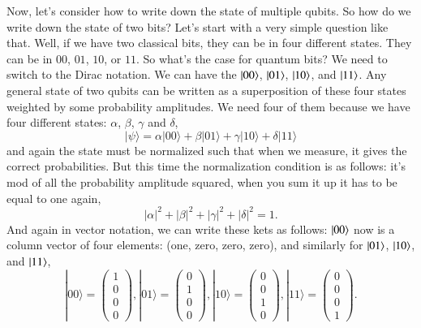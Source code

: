 Now, let's consider how to write down the state of multiple qubits. So how do we write down the state of two bits? Let's start with a very simple question like that. Well, if we have two classical bits, they can be in four different states. They can be in $00$, $01$, $10$, or $11$. So what's the case for quantum bits? We need to switch to the Dirac notation. We can have the $\left| 00 \right\rangle$, $\left| 01 \right\rangle$, $\left| 10 \right\rangle$, and $\left| 11 \right\rangle$. Any general state of two qubits can be written as a superposition of these four states weighted by some probability amplitudes. We need four of them because we have four different states: $\alpha$, $\beta$, $\gamma$ and $\delta$, 
\begin{equation}
|\psi\rangle=\alpha|00\rangle+\beta|01\rangle+\gamma|10\rangle+\delta|11\rangle
\end{equation}
and again the state must be normalized such that when we measure, it gives the correct probabilities. But this time the normalization condition is as follows: it's mod of all the probability amplitude squared, when you sum it up it has to be equal to one again,
\begin{equation}
|\alpha|^2+|\beta|^2+|\gamma|^2+|\delta|^2 = 1.
\end{equation}
And again in vector notation, we can write these kets as follows: $\left| 00 \right\rangle$ now is a column vector of four elements: (one, zero, zero, zero), and similarly for $\left| 01 \right\rangle$, $\left| 10 \right\rangle$, and $\left| 11 \right\rangle$,
\begin{equation}
|00\rangle=\left(\begin{array}{l}
1 \\
0 \\
0 \\
0
\end{array}\right),|01\rangle=\left(\begin{array}{l}
0 \\
1 \\
0 \\
0
\end{array}\right),|10\rangle=\left(\begin{array}{l}
0 \\
0 \\
1 \\
0
\end{array}\right),|11\rangle=\left(\begin{array}{l}
0 \\
0 \\
0 \\
1
\end{array}\right).
\end{equation}
